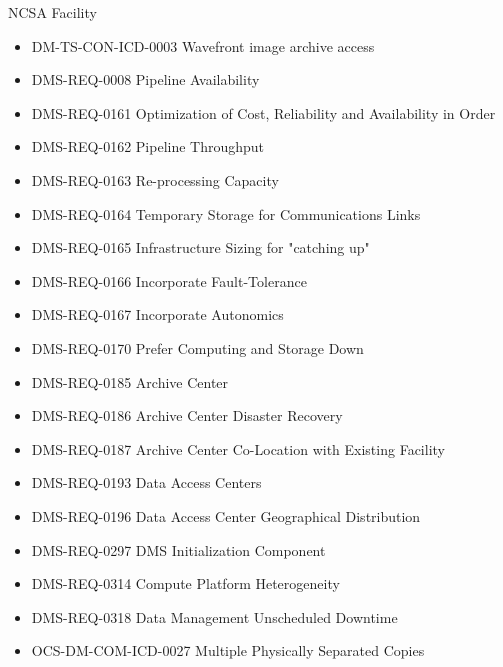 NCSA Facility \begin{itemize}
\item DM-TS-CON-ICD-0003 Wavefront image archive access
\item DMS-REQ-0008 Pipeline Availability
\item DMS-REQ-0161 Optimization of Cost, Reliability and Availability in Order
\item DMS-REQ-0162 Pipeline Throughput
\item DMS-REQ-0163 Re-processing Capacity
\item DMS-REQ-0164 Temporary Storage for Communications Links
\item DMS-REQ-0165 Infrastructure Sizing for "catching up"
\item DMS-REQ-0166 Incorporate Fault-Tolerance
\item DMS-REQ-0167 Incorporate Autonomics
\item DMS-REQ-0170 Prefer Computing and Storage Down
\item DMS-REQ-0185 Archive Center
\item DMS-REQ-0186 Archive Center Disaster Recovery
\item DMS-REQ-0187 Archive Center Co-Location with Existing Facility
\item DMS-REQ-0193 Data Access Centers
\item DMS-REQ-0196 Data Access Center Geographical Distribution
\item DMS-REQ-0297 DMS Initialization Component
\item DMS-REQ-0314 Compute Platform Heterogeneity
\item DMS-REQ-0318 Data Management Unscheduled Downtime
\item OCS-DM-COM-ICD-0027 Multiple Physically Separated Copies
\end{itemize}
